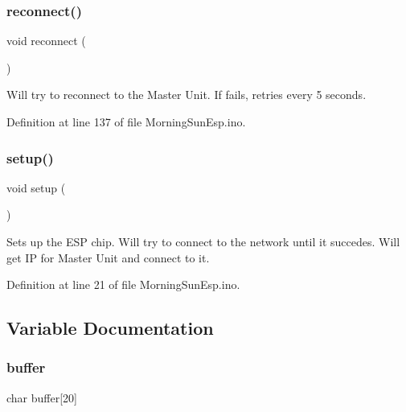 \mbox{\label{_morning_sun_esp_8ino_a4bcd6ce7d04c38f8c4ff908d1fc50f86}} 
\subsubsection{\texorpdfstring{reconnect()}{reconnect()}}
{\footnotesize\ttfamily void reconnect (\begin{DoxyParamCaption}{ }\end{DoxyParamCaption})}

Will try to reconnect to the Master Unit. If fails, retries every 5 seconds. 

Definition at line 137 of file Morning\+Sun\+Esp.\+ino.

\mbox{\label{_morning_sun_esp_8ino_a4fc01d736fe50cf5b977f755b675f11d}} 
\subsubsection{\texorpdfstring{setup()}{setup()}}
{\footnotesize\ttfamily void setup (\begin{DoxyParamCaption}{ }\end{DoxyParamCaption})}

Sets up the E\+SP chip. Will try to connect to the network until it succedes. Will get IP for Master Unit and connect to it. 

Definition at line 21 of file Morning\+Sun\+Esp.\+ino.



\subsection{Variable Documentation}
\mbox{\label{_morning_sun_esp_8ino_a5819dbc2d305e99e930c734a0d28bc3b}} 
\subsubsection{\texorpdfstring{buffer}{buffer}}
{\footnotesize\ttfamily char buffer\mbox{[}20\mbox{]}}



